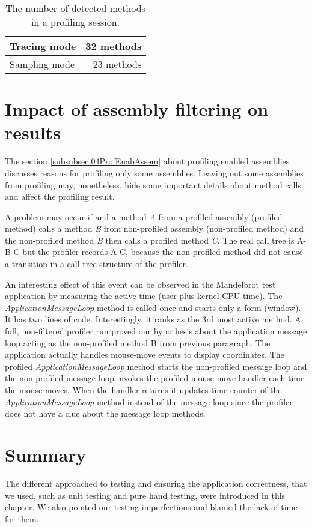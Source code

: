 \begin{table}[h!]
\centering
    \begin{tabular}{|l|r|}
        \hline
        Tracing mode  & 32 methods \\ \hline
        Sampling mode & 23 methods \\
        \hline
    \end{tabular}
     \caption{The number of detected methods in a profiling session. }
    \label{07tbl:compareResultsExactness}
\end{table}

\section{Impact of assembly filtering on results}
The section \ref{subsubsec:04ProfEnabAssem} about profiling enabled assemblies discusses reasons for profiling only some assemblies. Leaving out some assemblies from profiling may, nonetheless, hide some important details about method calls and affect the profiling result. 

A problem may occur if and a method \textit{A} from a profiled assembly (profiled method) calls a method \textit{B} from non-profiled assembly (non-profiled method) and the non-profiled method \textit{B} then calls a profiled method \textit{C}. The real call tree is A-B-C but the profiler records A-C, because the non-profiled method did not cause a transition in a call tree structure of the profiler. 

An interesting effect of this event can be observed in the Mandelbrot test application by measuring the active time (user plus kernel CPU time). The \textit{ApplicationMessageLoop} method is called once and starts only a form (window). It has two lines of code. Interestingly, it ranks as the 3rd most active method. A full, non-filtered profiler run proved our hypothesis about the application message loop acting as the non-profiled method B from previous paragraph. The application actually handles mouse-move events to display coordinates. The profiled \textit{ApplicationMessageLoop} method starts the non-profiled message loop and the non-profiled message loop invokes the profiled mouse-move handler each time the mouse moves. When the handler returns it updates time counter of the \textit{ApplicationMessageLoop} method instead of the message loop since the profiler does not have a clue about the message loop methods.

\section{Summary}
The different approached to testing and ensuring the application correctness, that we used, such as unit testing and pure hand testing, were introduced in this chapter. We also pointed our testing imperfections and blamed the lack of time for them.

